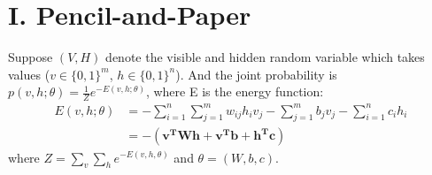 

\usepackage{graphicx, amssymb, amsmath, listings, float, mathtools}
\usepackage{color, url}
\lstset{language = Python}
\lstset{breaklines}
\lstset{extendedchars=false}
\usepackage{xcolor}

\oddsidemargin 0in
\evensidemargin 0in
\textwidth 6.5in
\topmargin -0.6in
\textheight 9.0in

\newsavebox\MBox
\newcommand\Cline[2][red]{{\sbox\MBox{$#2$}%
  \rlap{\usebox\MBox}\color{#1}\rule[-2\dp\MBox]{\wd\MBox}{2pt}}}




\section*{\Large I. Pencil-and-Paper}
Suppose $(V, H)$ denote the visible and hidden random variable which takes values ($v \in \{0, 1\}^m$, $h \in \{0, 1\}^n$). And the joint probability is $p(v, h; \theta) = \frac{1}{Z}e^{-E(v, h; \theta)}$, where E is the energy function:
\begin{equation}
\begin{split}
E(v, h; \theta) & = -\sum_{i=1}^n \sum_{j=1}^m w_{ij} h_i v_j - \sum_{j=1}^m b_j v_j - \sum_{i=1}^n c_i h_i \\
				& = -(\mathbf{v^T W h + v^T b + h^T c})
\end{split}
\end{equation}
where $Z = \sum_v \sum_h e^{-E(v, h, \theta)}$ and $\theta = (W, b, c)$.


